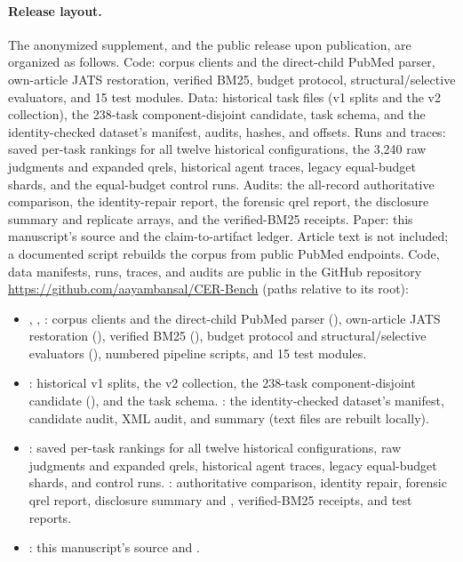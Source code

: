 \paragraph{Release layout.}
\ifanon
The anonymized supplement, and the public release upon publication, are organized as follows. Code: corpus clients and the direct-child PubMed parser, own-article JATS restoration, verified BM25, budget protocol, structural/selective evaluators, and 15 test modules. Data: historical task files (v1 splits and the v2 collection), the 238-task component-disjoint candidate, task schema, and the identity-checked dataset's manifest, audits, hashes, and offsets. Runs and traces: saved per-task rankings for all twelve historical configurations, the 3,240 raw judgments and expanded qrels, historical agent traces, legacy equal-budget shards, and the equal-budget control runs. Audits: the all-record authoritative comparison, the identity-repair report, the forensic qrel report, the disclosure summary and replicate arrays, and the verified-BM25 receipts. Paper: this manuscript's source and the claim-to-artifact ledger. Article text is not included; a documented script rebuilds the corpus from public PubMed endpoints.
\else
Code, data manifests, runs, traces, and audits are public in the GitHub repository \url{https://github.com/aayambansal/CER-Bench} (paths relative to its root):
\begin{itemize}
\item {}, , : corpus clients and the direct-child PubMed parser (), own-article JATS restoration (), verified BM25 (), budget protocol and structural/selective evaluators (), numbered pipeline scripts, and 15 test modules.
\item {}: historical v1 splits, the v2 collection, the 238-task component-disjoint candidate (), and the task schema. : the identity-checked dataset's manifest, candidate audit, XML audit, and summary (text files are rebuilt locally).
\item {}: saved per-task rankings for all twelve historical configurations, raw judgments and expanded qrels, historical agent traces, legacy equal-budget shards, and control runs. : authoritative comparison, identity repair, forensic qrel report, disclosure summary and , verified-BM25 receipts, and test reports.
\item {}: this manuscript's source and .
\end{itemize}
